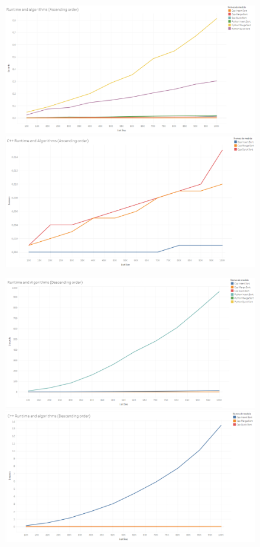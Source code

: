 \documentclass{article}
\begin{document}
\begin{figure}[!h]
	\centering
	\includegraphics[scale=0.3]{images/runtime_ALL-ascending.png}
	\includegraphics[scale=0.3]{images/runtime_cppONLY-ascending.png}		
\end{figure}

\begin{figure}[!h]
	\centering
	\includegraphics[scale=0.3]{images/runtime_ALL-descending.png}
	\includegraphics[scale=0.3]{images/runtime_cppONLY-descending.png}
\end{figure}
\end{document}
